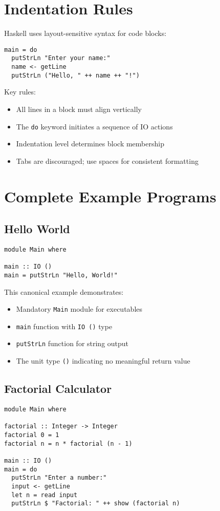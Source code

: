 \documentclass{book}
\begin{document}
\section{Indentation Rules}
\label{sec:indentation}

Haskell uses layout-sensitive syntax for code blocks:
\begin{lstlisting}
main = do
  putStrLn "Enter your name:"
  name <- getLine
  putStrLn ("Hello, " ++ name ++ "!")
\end{lstlisting}

Key rules:
\begin{itemize}
\item All lines in a block must align vertically
\item The \texttt{do} keyword initiates a sequence of IO actions
\item Indentation level determines block membership
\item Tabs are discouraged; use spaces for consistent formatting
\end{itemize}

\section{Complete Example Programs}
\label{sec:examples}

\subsection{Hello World}
\begin{lstlisting}
module Main where

main :: IO ()
main = putStrLn "Hello, World!"
\end{lstlisting}

This canonical example demonstrates:
\begin{itemize}
\item Mandatory \texttt{Main} module for executables
\item \texttt{main} function with \texttt{IO ()} type
\item \texttt{putStrLn} function for string output
\item The unit type \texttt{()} indicating no meaningful return value
\end{itemize}

\subsection{Factorial Calculator}
\begin{lstlisting}
module Main where

factorial :: Integer -> Integer
factorial 0 = 1
factorial n = n * factorial (n - 1)

main :: IO ()
main = do
  putStrLn "Enter a number:"
  input <- getLine
  let n = read input
  putStrLn $ "Factorial: " ++ show (factorial n)
\end{lstlisting}
\end{document}
